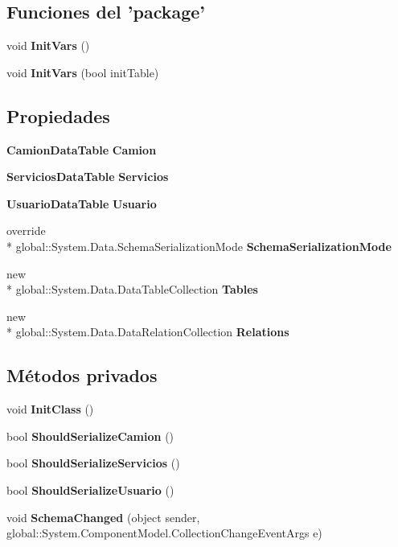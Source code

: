 \subsection*{Funciones del 'package'}
\begin{DoxyCompactItemize}
\item 
void {\bf Init\-Vars} ()
\item 
void {\bf Init\-Vars} (bool init\-Table)
\end{DoxyCompactItemize}
\subsection*{Propiedades}
\begin{DoxyCompactItemize}
\item 
{\bf Camion\-Data\-Table} {\bf Camion}\hspace{0.3cm}{\ttfamily  [get]}
\item 
{\bf Servicios\-Data\-Table} {\bf Servicios}\hspace{0.3cm}{\ttfamily  [get]}
\item 
{\bf Usuario\-Data\-Table} {\bf Usuario}\hspace{0.3cm}{\ttfamily  [get]}
\item 
override \\*
global\-::\-System.\-Data.\-Schema\-Serialization\-Mode {\bf Schema\-Serialization\-Mode}\hspace{0.3cm}{\ttfamily  [get, set]}
\item 
new \\*
global\-::\-System.\-Data.\-Data\-Table\-Collection {\bf Tables}\hspace{0.3cm}{\ttfamily  [get]}
\item 
new \\*
global\-::\-System.\-Data.\-Data\-Relation\-Collection {\bf Relations}\hspace{0.3cm}{\ttfamily  [get]}
\end{DoxyCompactItemize}
\subsection*{Métodos privados}
\begin{DoxyCompactItemize}
\item 
void {\bf Init\-Class} ()
\item 
bool {\bf Should\-Serialize\-Camion} ()
\item 
bool {\bf Should\-Serialize\-Servicios} ()
\item 
bool {\bf Should\-Serialize\-Usuario} ()
\item 
void {\bf Schema\-Changed} (object sender, global\-::\-System.\-Component\-Model.\-Collection\-Change\-Event\-Args e)
\end{DoxyCompactItemize}
